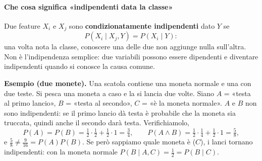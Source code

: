 \documentclass[12pt]{extarticle}
\begin{document}
\begin{center}
\end{center}

\paragraph{Che cosa significa «indipendenti data la classe»}
Due feature $X_i$ e $X_j$ sono \textbf{condizionatamente indipendenti} dato $Y$ se
\[
P(X_i \mid X_j, Y) = P(X_i \mid Y):
\]
una volta nota la classe, conoscere una delle due non aggiunge nulla sull'altra. Non è l'indipendenza semplice: due variabili possono essere dipendenti e diventare indipendenti quando si conosce la causa comune.

\noindent\textbf{Esempio (due monete).} Una scatola contiene una moneta normale e una con due teste. Si pesca una moneta a caso e la si lancia due volte. Siano $A$ = «testa al primo lancio», $B$ = «testa al secondo», $C$ = «è la moneta normale». $A$ e $B$ non sono indipendenti: se il primo lancio dà testa è probabile che la moneta sia truccata, quindi anche il secondo darà testa. Verifichiamolo,
\[
P(A)=P(B)=\tfrac12\cdot\tfrac12+\tfrac12\cdot 1=\tfrac34,
\qquad
P(A\land B)=\tfrac12\cdot\tfrac14+\tfrac12\cdot 1=\tfrac58,
\]
e $\tfrac58 \neq \tfrac{9}{16}=P(A)P(B)$. Se però sappiamo quale moneta è ($C$), i lanci tornano indipendenti: con la moneta normale $P(B\mid A,C)=\tfrac12=P(B\mid C)$.
\end{document}
